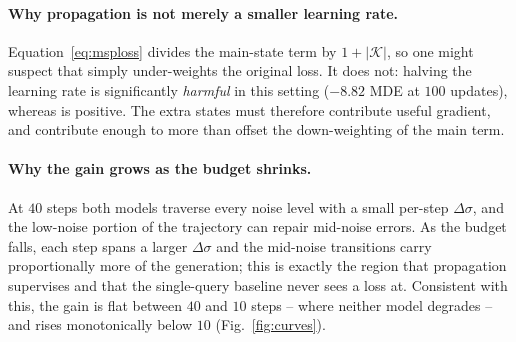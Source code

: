 \paragraph{Why propagation is not merely a smaller learning rate.} Equation~\eqref{eq:msploss}
divides the main-state term by $1+|\mathcal K|$, so one might suspect that \MSP simply
under-weights the original loss. It does not: halving the learning rate is significantly
\emph{harmful} in this setting ($-8.82$ MDE at $100$ updates), whereas \MSP is positive.
The extra states must therefore contribute useful gradient, and contribute enough to more
than offset the down-weighting of the main term.

\paragraph{Why the gain grows as the budget shrinks.} At $40$ steps both models traverse
every noise level with a small per-step $\Delta\sigma$, and the low-noise portion of the
trajectory can repair mid-noise errors. As the budget falls, each step spans a larger
$\Delta\sigma$ and the mid-noise transitions carry proportionally more of the generation;
this is exactly the region that propagation supervises and that the single-query baseline
never sees a loss at. Consistent with this, the gain is flat between $40$ and $10$ steps --
where neither model degrades -- and rises monotonically below $10$
(Fig.~\ref{fig:curves}).
